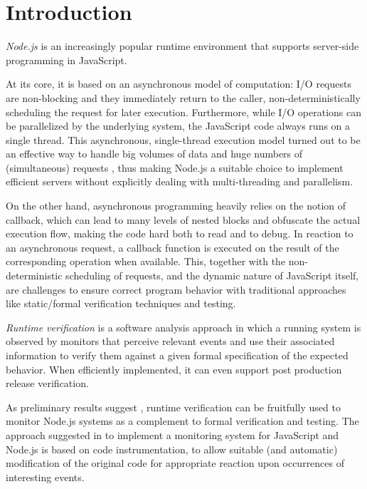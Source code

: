 \section{Introduction}
\emph{Node.js} is an increasingly popular runtime environment that supports server-side programming in JavaScript.

At its core, it is based on an asynchronous model of computation: I/O requests are non-blocking and they immediately return to the caller, non-deterministically scheduling the request for later execution.
Furthermore, while I/O operations can be parallelized by the underlying system, the JavaScript code always runs on a single thread.
This asynchronous, single-thread execution model turned out to be an effective way to handle big volumes of data and huge numbers of (simultaneous) requests \cite{Nodejs10,NodejsPerformance14}, thus making Node.js a suitable choice to implement efficient servers without explicitly dealing with multi-threading and parallelism.


%

On the other hand, asynchronous programming heavily relies on the notion of callback, which can lead to many levels of nested blocks and obfuscate the actual execution flow, making the code hard both to read and to debug.
In reaction to an asynchronous request, a callback function is executed on the result of the corresponding operation when available.
This, together with the non-deterministic scheduling of requests, and the dynamic nature of JavaScript itself, are challenges to ensure correct program behavior with traditional approaches like static/formal verification techniques and testing.

\emph{Runtime verification} \cite{rv} is a software analysis approach in which a running system is observed by monitors that perceive relevant events and use their associated information to verify them against a given formal specification of the expected behavior.
When efficiently implemented, it can even support post production release verification.

As preliminary results suggest \cite{TowardsIoT17}, runtime verification can be fruitfully used to monitor Node.js systems as a complement to formal verification and testing.
The approach suggested in \cite{TowardsIoT17} to implement a monitoring system for JavaScript and Node.js is based on code instrumentation, to allow suitable (and automatic) modification of the original code for appropriate reaction upon occurrences of interesting events.

